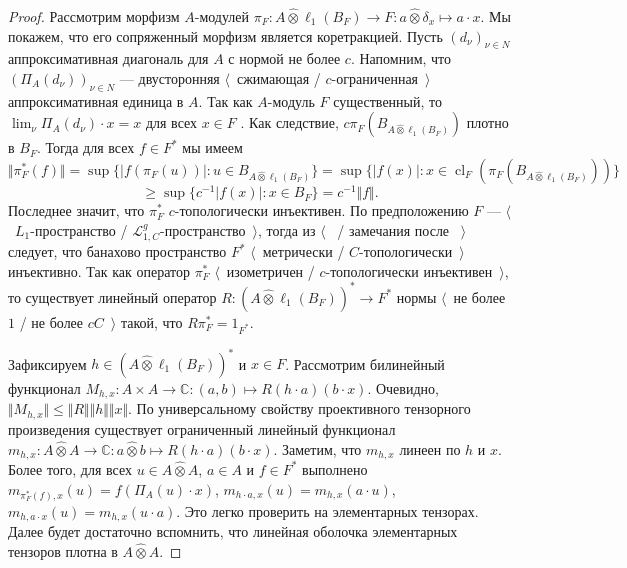 \documentclass[12pt]{article}
\newcommand{\projtens}{\mathbin{\widehat{\otimes}}}
\begin{document}
\begin{proof} Рассмотрим морфизм $A$-модулей $\pi_F:A\projtens \ell_1(B_F)\to F:a\projtens \delta_x\mapsto a\cdot x$. Мы покажем, что его сопряженный морфизм является коретракцией. Пусть $(d_\nu)_{\nu\in N}$ аппроксимативная диагональ для $A$ с нормой не более $c$. Напомним, что $(\Pi_A(d_\nu))_{\nu\in N}$ --- двусторонняя $\langle$~сжимающая / $c$-ограниченная~$\rangle$ аппроксимативная единица в $A$. Так как $A$-модуль $F$ существенный, то $\lim_{\nu}\Pi_A(d_\nu)\cdot x=x$ для всех $x\in F$ \cite[предложение 0.3.15]{HelHomolBanTopAlg}. Как следствие, $c\pi_F(B_{A\projtens\ell_1(B_F)})$ плотно в $B_F$. Тогда для всех $f\in F^*$ мы имеем
\[
\Vert\pi_F^*(f)\Vert
=\sup\{|f(\pi_F(u))|:u\in B_{A\projtens\ell_1(B_F)}\}
=\sup\{|f(x)|:x\in \operatorname{cl}_F(\pi_F(B_{A\projtens\ell_1(B_F)}))\}
\]
\[
\geq\sup\{c^{-1}|f(x)|:x\in B_F\}=c^{-1}\Vert f\Vert.
\]
Последнее значит, что $\pi_F^*$ $c$-топологически инъективен. По предположению $F$ --- $\langle$~$L_1$-пространство / $\mathcal{L}_{1,C}^g$-пространство~$\rangle$, тогда из $\langle$~\cite[теорема 1]{GrothMetrProjFlatBanSp} / замечания после \cite[следствие 23.5(1)]{DefFloTensNorOpId}~$\rangle$ следует, что банахово пространство $F^*$ $\langle$~метрически / $C$-топологически~$\rangle$ инъективно. Так как оператор $\pi_F^*$ $\langle$~изометричен / $c$-топологически инъективен~$\rangle$, то существует линейный оператор $R:(A\projtens\ell_1(B_F))^*\to F^*$ нормы $\langle$~не более $1$ / не более $cC$~$\rangle$ такой, что $R\pi_F^*=1_{F^*}$.

Зафиксируем $h\in (A\projtens\ell_1(B_F))^*$ и $x\in F$. Рассмотрим билинейный функционал $M_{h,x}:A\times A\to\mathbb{C}:(a,b)\mapsto R(h\cdot a)(b\cdot x)$. Очевидно, $\Vert M_{h,x}\Vert\leq\Vert R\Vert\Vert h\Vert\Vert x\Vert$. По универсальному свойству проективного тензорного произведения существует ограниченный линейный функционал $m_{h,x}:A\projtens A\to\mathbb{C}:a\projtens b\mapsto R(h\cdot a)(b\cdot x)$. Заметим, что $m_{h,x}$ линеен по $h$ и $x$. Более того, для всех $u\in A\projtens A$, $a\in A$ и $f\in F^*$ выполнено $m_{\pi_F^*(f),x}(u)=f(\Pi_A(u)\cdot x)$, $m_{h\cdot a,x}(u)=m_{h,x}(a\cdot u)$, $m_{h,a\cdot x}(u)=m_{h,x}(u\cdot a)$. Это легко проверить на элементарных тензорах. Далее будет достаточно вспомнить, что линейная оболочка элементарных тензоров плотна в $A\projtens A$.


\end{proof}
\end{document}
